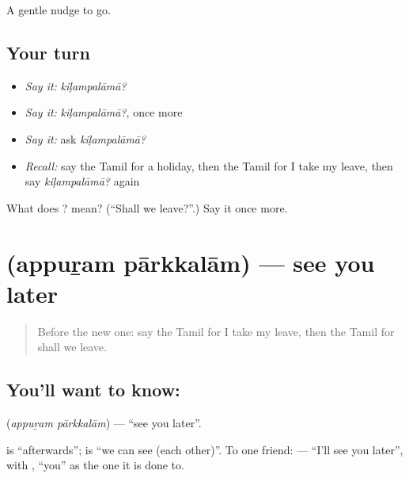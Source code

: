 \begin{grammarlens}[title={What you've built}]
A gentle nudge to go.
\end{grammarlens}

\subsection*{Your turn}
\begin{itemize}
\raggedright
  \item \emph{Say it:} \emph{kiḷampalāmā?}
  \item \emph{Say it:} \emph{kiḷampalāmā?}, once more
  \item \emph{Say it:} ask \emph{kiḷampalāmā?}
  \item \emph{Recall:} say the Tamil for a holiday, then the Tamil for I take my leave, then say \emph{kiḷampalāmā?} again
\end{itemize}

\begin{tcolorbox}[breakable,colback=teal!4,colframe=teal!35!black,title={Before you move on}]
What does ? mean? (\textquotedblleft{}Shall we leave?\textquotedblright{}.) Say it once more.
\end{tcolorbox}
\section[\texorpdfstring{\ta{அப்புறம்} \ta{பார்க்கலாம்} (appuṟam pārkkalām)}{அப்புறம் பார்க்கலாம் (appuṟam pārkkalām)}]{  (appuṟam pārkkalām) — see you later}

\label{lesson:TA-C107-seeyoulater}



\begin{quote}
Before the new one: say the Tamil for I take my leave, then the Tamil for shall we leave.
\end{quote}

\subsection*{You'll want to know:  }
\textbf{ } (\emph{appuṟam pārkkalām}) — \textquotedblleft{}see you later\textquotedblright{}.

\textbf{} is \textquotedblleft{}afterwards\textquotedblright{}; \textbf{} is \textquotedblleft{}we can see (each other)\textquotedblright{}. To one friend: \textbf{  } — \textquotedblleft{}I'll see you later\textquotedblright{}, with \textbf{}, \textquotedblleft{}you\textquotedblright{} as the one it is done to.

